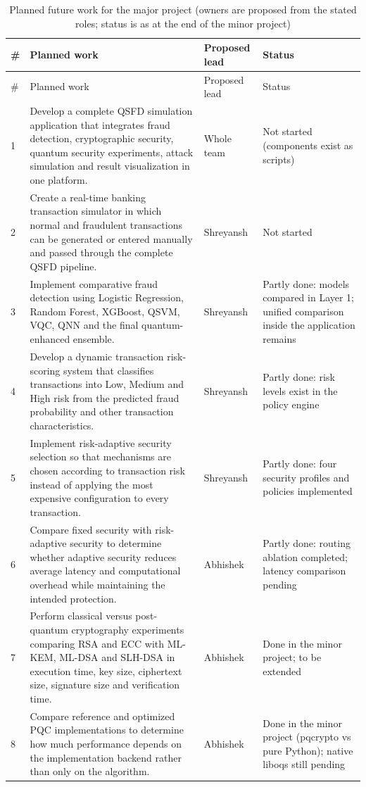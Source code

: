 \begin{longtable}{@{}p{0.6cm}p{7.2cm}p{2.0cm}p{3.2cm}@{}}
\caption{Planned future work for the major project (owners are proposed from the stated roles; status is as at the end of the minor project)}\label{tab:future}\\
\toprule \# & Planned work & Proposed lead & Status\\ \midrule \endfirsthead
\toprule \# & Planned work & Proposed lead & Status\\ \midrule \endhead
1 & Develop a complete QSFD simulation application that integrates fraud detection, cryptographic security, quantum security experiments, attack simulation and result visualization in one platform. & Whole team & Not started (components exist as scripts)\\
2 & Create a real-time banking transaction simulator in which normal and fraudulent transactions can be generated or entered manually and passed through the complete QSFD pipeline. & Shreyansh & Not started\\
3 & Implement comparative fraud detection using Logistic Regression, Random Forest, XGBoost, QSVM, VQC, QNN and the final quantum-enhanced ensemble. & Shreyansh & Partly done: models compared in Layer 1; unified comparison inside the application remains\\
4 & Develop a dynamic transaction risk-scoring system that classifies transactions into Low, Medium and High risk from the predicted fraud probability and other transaction characteristics. & Shreyansh & Partly done: risk levels exist in the policy engine\\
5 & Implement risk-adaptive security selection so that mechanisms are chosen according to transaction risk instead of applying the most expensive configuration to every transaction. & Shreyansh & Partly done: four security profiles and policies implemented\\
6 & Compare fixed security with risk-adaptive security to determine whether adaptive security reduces average latency and computational overhead while maintaining the intended protection. & Abhishek & Partly done: routing ablation completed; latency comparison pending\\
7 & Perform classical versus post-quantum cryptography experiments comparing RSA and ECC with ML-KEM, ML-DSA and SLH-DSA in execution time, key size, ciphertext size, signature size and verification time. & Abhishek & Done in the minor project; to be extended\\
8 & Compare reference and optimized PQC implementations to determine how much performance depends on the implementation backend rather than only on the algorithm. & Abhishek & Done in the minor project (pqcrypto vs pure Python); native liboqs still pending\\

\end{longtable}
